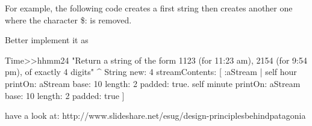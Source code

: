 \documentclass[a4paper,10pt,twoside]{book}
\begin{document}
For example, the following code creates a first string then creates another one where the character \$: is removed.  


Better implement it as 


\begin{code}{}
Time>>hhmm24
 	"Return a string of the form 1123 (for 11:23 am), 2154 (for 9:54 pm), of exactly 4 digits"
 	^ String new: 4 streamContents: [ :aStream | 
		self hour printOn: aStream base: 10 length: 2 padded: true.
		self minute printOn: aStream base: 10 length: 2 padded: true ]
\end{code}


have a look at: 
http://www.slideshare.net/esug/design-principlesbehindpatagonia




\ifx\wholebook\relax\else
\end{document}

